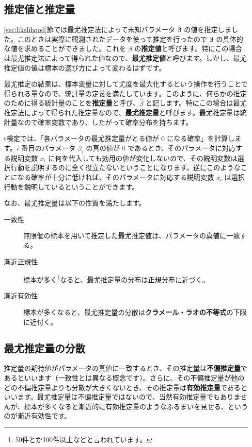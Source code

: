 \subsection{推定値と推定量}\label{ssec:estimator}

\ref{sec:likelihood}節では最尤推定法によって未知パラメータ $\bm\beta$ の値を推定しました。このときは実際に観測されたデータを使って推定を行ったので $\bm\beta$ の具体的な値を求めることができました。これを $\beta$ の\textbf{推定値}と呼びます。特にこの場合は最尤推定法によって得られた値なので、\textbf{最尤推定値}と呼びます。しかし、最尤推定値の値は標本の選び方によって変わるはずです。

最尤推定の結果は、標本変量に対して尤度を最大化するという操作を行うことで得られる量なので、統計量の定義を満たしています。このように、何らかの推定のために得る統計量のことを\textbf{推定量}と呼び、$\hat\beta$ と記します。特にこの場合は最尤推定法によって得られた推定量なので、\textbf{最尤推定量}と呼びます。最尤推定量は統計量なので確率変数であり、したがって確率分布を持ちます。

t検定では、「各パラメータの最尤推定量がとる値が $0$ になる確率」を計算します。$i$ 番目のパラメータ $\beta_i$ の真の値が $0$ であるとき、そのパラメータに対応する説明変数 $x_i$ に何を代入しても効用の値が変化しないので、その説明変数は選択行動を説明するのに全く役立たないということになります。逆にこのようなことになる確率が十分に低ければ、そのパラメータに対応する説明変数 $x_i$ は選択行動を説明しているということができます。

なお、最尤推定量は以下の性質を満たします。

\begin{description}
    \item[一致性] 無限個の標本を用いて推定した最尤推定値は、パラメータの真値に一致する。
    \item[漸近正規性] 標本が多く\footnote{50件とか100件以上などと言われています。}なると、最尤推定量の分布は正規分布に近づく。
    \item[漸近有効性] 標本が多くなると、最尤推定量の分散は\textbf{クラメール・ラオの不等式}の下限に近付く。
\end{description}

\subsection{最尤推定量の分散}\label{ssec:variance_estimator}

推定量の期待値がパラメータの真値に一致するとき、その推定量は\textbf{不偏推定量}であるといいます（一致性とは異なる概念です）。さらに、その不偏推定量が他のどの不偏推定量よりも分散が大きくないとき、その推定量は\textbf{有効推定量}であるといいます。最尤推定量は不偏推定量ではないので、当然有効推定量でもありませんが、標本が多くなると漸近的に有効推定量のようなふるまいを見せる、というのが漸近有効性です。

